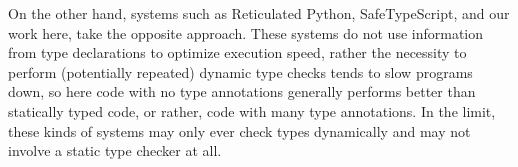 On the other hand, systems such as Reticulated Python\citep{reticPython2014}, SafeTypeScript\citep{Richards2017}, and our
work here, take the opposite approach.
These systems do not use information from type
declarations to optimize execution speed, rather the necessity to
perform (potentially repeated) dynamic type checks tends to slow
programs down, so here code with no type annotations generally
performs better than statically typed code, or rather, code with many
type annotations. In the limit, these kinds of systems may only ever
check types dynamically and may not involve a static type checker at
all. 


